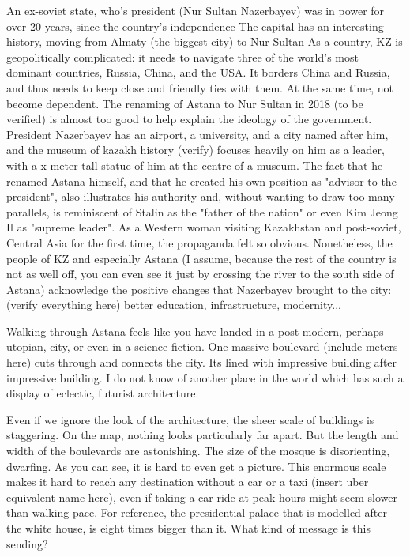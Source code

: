 \documentclass{article}
\begin{document}
An ex-soviet state, who's president (Nur Sultan Nazerbayev) was in power for over 20 years, since the country's independence
The capital has an interesting history, moving from Almaty (the biggest city) to Nur Sultan
As a country, KZ is geopolitically complicated: it needs to navigate three of the world's most dominant countries, Russia, China, and the USA. It borders China and Russia, and thus needs to keep close and friendly ties with them. At the same time, not become dependent.
The renaming of Astana to Nur Sultan in 2018 (to be verified) is almost too good to help explain the ideology of the government. President Nazerbayev has an airport, a university, and a city named after him, and the museum of kazakh history (verify) focuses heavily on him as a leader, with a x meter tall statue of him at the centre of a museum.
 The fact that he renamed Astana himself, and that he created his own position as "advisor to the president", also illustrates his authority and, without wanting to draw too many parallels, is reminiscent of Stalin as the "father of the nation" or even Kim Jeong Il as "supreme leader". 
 As a Western woman visiting Kazakhstan and post-soviet, Central Asia for the first time, the propaganda felt so obvious.
 Nonetheless, the people of KZ and especially Astana (I assume, because the rest of the country is not as well off, you can even see it just by crossing the river to the south side of Astana) acknowledge the positive changes that Nazerbayev brought to the city: (verify everything here) better education, infrastructure, modernity...
 
Walking through Astana feels like you have landed in a post-modern, perhaps utopian, city, or even in a science fiction. One massive boulevard (include meters here) cuts through and connects the city. Its lined with impressive building after impressive building. I do not know of another place in the world which has such a display of eclectic, futurist architecture.

Even if we ignore the look of the architecture, the sheer scale of buildings is staggering. On the map, nothing looks particularly far apart. But the length and width of the boulevards are astonishing. The size of the mosque is disorienting, dwarfing. As you can see, it is hard to even get a picture. 
This enormous scale makes it hard to reach any destination without a car or a taxi (insert uber equivalent name here), even if taking a car ride at peak hours might seem slower than walking pace. 
For reference, the presidential palace that is modelled after the white house, is eight times bigger than it. What kind of message is this sending? 
\end{document}
